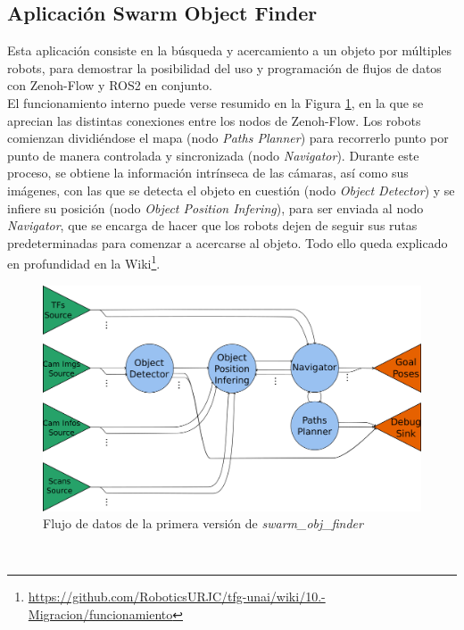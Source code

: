 \subsection{Aplicación Swarm Object Finder}
\label{sec:swarm_obj_finder}

Esta aplicación consiste en la búsqueda y acercamiento a un objeto por múltiples
robots, para demostrar la posibilidad del uso y programación de flujos de datos
con Zenoh-Flow y ROS2 en conjunto.
\\

El funcionamiento interno puede verse resumido en la Figura
\ref{fig:data_flow_scheme}, en la que se aprecian las distintas conexiones entre
los nodos de Zenoh-Flow.
Los robots comienzan dividiéndose el mapa (nodo \textit{Paths Planner}) para
recorrerlo punto por punto de manera controlada y sincronizada (nodo
\textit{Navigator}).
Durante este proceso, se obtiene la información intrínseca de las cámaras, así
como sus imágenes, con las que se detecta el objeto en cuestión (nodo
\textit{Object Detector}) y se infiere su posición (nodo \textit{Object Position
Infering}), para ser enviada al nodo \textit{Navigator}, que se encarga de hacer
que los robots dejen de seguir sus rutas predeterminadas para comenzar a
acercarse al objeto.
Todo ello queda explicado en profundidad en la Wiki\footnote{
\href{https://github.com/RoboticsURJC/tfg-unai/wiki/10.-Migraci\%C3\%B3n-de-swarm\_obj\_finder-a-la-nueva-version-de-Zenoh\%E2\%80\%90flow-\%5B20-Ago-\%E2\%80\%90-30-Sep\%5D\#c\%C3\%B3mo-funciona-swarm\_obj\_finder-y-zenoh-flow}{https://github.com/RoboticsURJC/tfg-unai/wiki/10.-Migracion/funcionamiento}}.

\begin{figure} [h!]
  \begin{center}
    \includegraphics[width=12cm]{figs/data_flow_scheme}
  \end{center}
  \caption{Flujo de datos de la primera versión de \textit{swarm\_obj\_finder}}
  \label{fig:data_flow_scheme}
\end{figure}\



